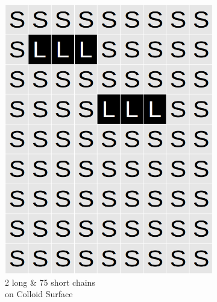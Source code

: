 \documentclass[journal=mamobx,manuscript=article]{achemso}
\begin{document}
\begin{figure}[H]
\begin{subfigure}[b]{0.4\textwidth}
        \includegraphics[scale=0.15]{fig8c.png}
        \caption{2 long \& 75 short chains\\ on Colloid Surface}
        \label{fig:C}
    \end{subfigure}
    \begin{subfigure}[b]{0.4\textwidth}

\end{subfigure}
\end{figure}
\end{document}
